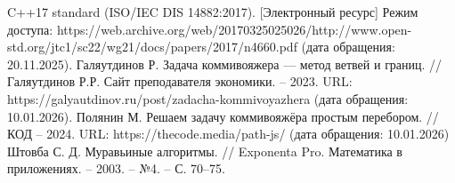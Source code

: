 \begin{thebibliography}{}
	 C++17 standard (ISO/IEC DIS 14882:2017). [Электронный ресурс] Режим доступа: https://web.archive.org/web/20170325025026/http://www.open-std.org/jtc1/sc22/wg21/docs/papers/2017/n4660.pdf (дата обращения: 20.11.2025).
	 Галяутдинов Р. Задача коммивояжера — метод ветвей и границ. // Галяутдинов Р.Р. Сайт преподавателя экономики. -- 2023. URL: https://galyautdinov.ru/post/zadacha-kommivoyazhera (дата обращения: 10.01.2026).
	 Полянин М. Решаем задачу коммивояжёра простым перебором. // КОД -- 2024. URL: https://thecode.media/path-js/ (дата обращения: 10.01.2026)
	 Штовба С. Д. Муравьиные алгоритмы. // Exponenta Pro. Математика в приложениях. -- 2003. -- №4. -- С. 70–75.
\end{thebibliography}

